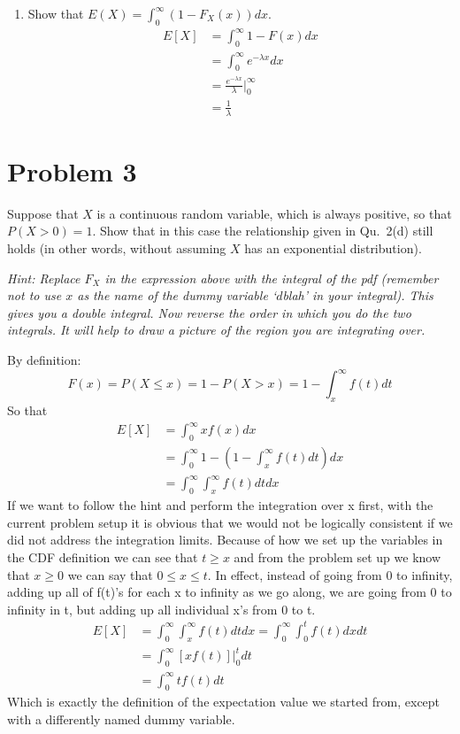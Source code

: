 \documentclass{article}
\newcommand{\1}{\mathbf{1}}
\begin{document}
\begin{enumerate}
    \newpage
    \item Show that $E(X) = \int_0^\infty (1-F_X(x)) dx.$
    \begin{align*}
        E[X] &= \int_0^\infty 1-F(x) dx \\
        &= \int_0^\infty e^{-\lambda x} dx \\
        &= \frac{e^{-\lambda x}}{\lambda} \bigg|_0^\infty \\
        &=\frac{1}{\lambda}
    \end{align*}
\end{enumerate}	
	


\newpage
\section*{Problem 3}
Suppose that $X$ is a continuous random variable, which is always positive, so that $P(X> 0)=1$.
Show that in this case the relationship given in Qu.~2(d) still holds (in other words, without assuming $X$ has
an exponential distribution).\par
{\it Hint: Replace $F_X$ in the expression above with the integral of the pdf (remember not to use $x$ as the name of the dummy variable `$d$blah' in your integral). This gives you a double integral. Now reverse the order in which you do the two integrals. It will help to draw a picture of the region you are integrating over.}

By definition:
$$ F(x) = P(X\leq x) = 1 - P(X>x) = 1 - \int_x^\infty f(t) dt$$
So that
\begin{align*}
    E[X] &=  \int_0^\infty xf(x) dx \\
    &=\int_0^\infty 1- \left(1 - \int_x^\infty f(t) dt\right) dx \\
    &= \int_0^\infty\int_x^\infty f(t) dtdx 
\end{align*}
If we want to follow the hint and perform the integration over x first, with the current problem setup it is obvious that we would not be logically consistent if we did not address the integration limits. Because of how we set up the variables in the CDF definition we can see that $t\geq x$ and from the problem set up we know that $x\geq 0$ we can say that $0\leq x \leq t$. In effect, instead of going from 0 to infinity, adding up all of f(t)'s for each x to infinity as we go along, we are going from 0 to infinity in t, but adding up all individual x's from 0 to t. 
\begin{align*}
    E[X] &=  \int_0^\infty\int_x^\infty f(t) dtdx  =  \int_0^\infty\int_0^t f(t) dxdt  \\
    &= \int_0^\infty \left[xf(t)\right]\big|_0^t dt \\
    &= \int_0^\infty tf(t) dt 
\end{align*}
Which is exactly the definition of the expectation value we started from, except with a differently named dummy variable.
\end{document}

